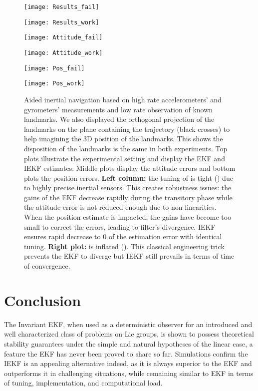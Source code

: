 \documentclass[a4paper,12pt,onecolumn]{article}
\begin{document}
\begin{figure*}[!h]
  \centering
\begin{minipage}[b][]{0.44\linewidth}\noindent
\texttt{[image: Results\_fail]}
\end{minipage}
\begin{minipage}[b][]{0.44\linewidth}\noindent
\texttt{[image: Results\_work]}
\end{minipage}
\begin{minipage}[b][]{0.44\linewidth}
\texttt{[image: Attitude\_fail]}
\end{minipage}
\begin{minipage}[b][]{0.44\linewidth}
\texttt{[image: Attitude\_work]}
\end{minipage}
\begin{minipage}[b][]{0.44\linewidth}\noindent
\texttt{[image: Pos\_fail]}
\end{minipage}
\begin{minipage}[b][]{0.44\linewidth}\noindent
\texttt{[image: Pos\_work]}
\end{minipage}
  \caption{Aided inertial navigation based on high rate accelerometers' and gyrometers' measurements and low rate observation of known landmarks. We also displayed the orthogonal projection of the landmarks on the plane containing the trajectory (black crosses) to help imagining the 3D position of the landmarks. This shows the disposition of the landmarks is the same in both experiments. Top plots illustrate the experimental setting and display the  EKF and IEKF estimates. Middle plots display the attitude errors and bottom plots the position errors. \textbf{Left column:} the tuning of  is tight () due to highly precise inertial sensors. This creates robustness issues: the gains of the EKF decrease rapidly during the transitory phase while the attitude error is not reduced enough due to non-linearities. When the position estimate is impacted, the gains have become too small to correct the errors, leading to filter's divergence. IEKF ensures rapid decrease to 0 of the estimation error with identical tuning. \textbf{Right plot:}    is inflated (). This classical engineering trick prevents the EKF to diverge but IEKF still prevails in terms of time of convergence.}
\label{fig::Simu_3D}
\end{figure*}


\section{Conclusion}
The Invariant EKF, when used as a deterministic observer for an introduced and well characterized class of problems on Lie groups, is shown to possess theoretical stability guarantees under the simple and natural hypotheses of the linear case, a feature the EKF has never been proved to share so far. Simulations confirm the   IEKF is an appealing alternative indeed, as it is always superior to the EKF and  outperforms it in challenging situations, while remaining similar to EKF in terms of tuning, implementation, and computational load. 
\end{document}
